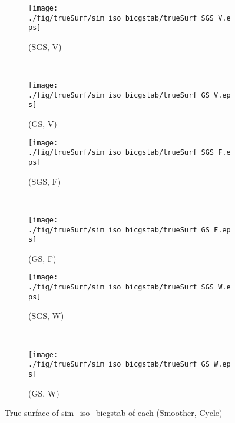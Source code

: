 \begin{figure}
  \centering
  \begin{subfigure}[h]{0.45\textwidth}
    \texttt{[image: ./fig/trueSurf/sim\_iso\_bicgstab/trueSurf\_SGS\_V.eps]}
    \caption{(SGS, V)}
  \end{subfigure}
  ~
  \begin{subfigure}[h]{0.45\textwidth}
    \texttt{[image: ./fig/trueSurf/sim\_iso\_bicgstab/trueSurf\_GS\_V.eps]}
    \caption{(GS, V)}
  \end{subfigure}
  
  \begin{subfigure}[h]{0.45\textwidth}
    \texttt{[image: ./fig/trueSurf/sim\_iso\_bicgstab/trueSurf\_SGS\_F.eps]}
    \caption{(SGS, F)}
  \end{subfigure}
  ~
  \begin{subfigure}[h]{0.45\textwidth}
    \texttt{[image: ./fig/trueSurf/sim\_iso\_bicgstab/trueSurf\_GS\_F.eps]}
    \caption{(GS, F)}
  \end{subfigure}
  
  \begin{subfigure}[h]{0.45\textwidth}
    \texttt{[image: ./fig/trueSurf/sim\_iso\_bicgstab/trueSurf\_SGS\_W.eps]}
    \caption{(SGS, W)}
  \end{subfigure}
  ~
  \begin{subfigure}[h]{0.45\textwidth}
    \texttt{[image: ./fig/trueSurf/sim\_iso\_bicgstab/trueSurf\_GS\_W.eps]}
    \caption{(GS, W)}
  \end{subfigure}
  \caption{True surface of sim\_iso\_bicgstab of each (Smoother, Cycle)}\label{fig:trueSurf_sim_iso_bicgstab}
\end{figure}
